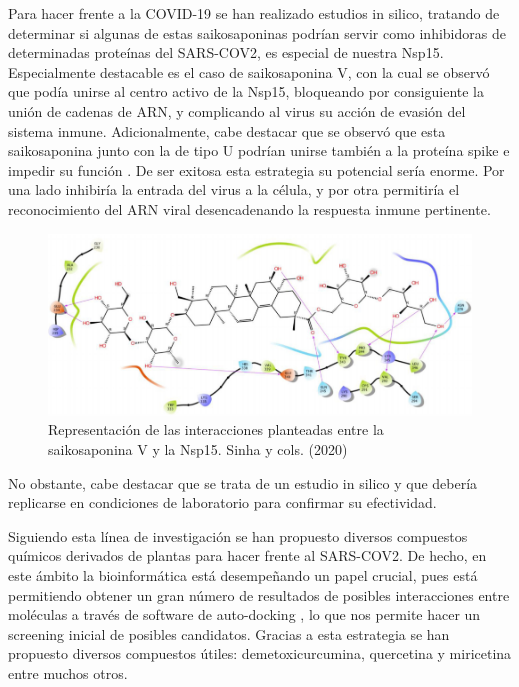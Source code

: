 \documentclass[12pt]{article}
\begin{document}
Para hacer frente a la COVID-19 se han realizado estudios in silico, tratando de determinar si algunas de estas saikosaponinas podrían servir como inhibidoras de determinadas proteínas del SARS-COV2, es especial de nuestra Nsp15. Especialmente destacable es el caso de saikosaponina V, con la cual se observó que podía unirse al centro activo de la Nsp15, bloqueando por consiguiente la unión de cadenas de ARN, y complicando al virus su acción de evasión del sistema inmune. Adicionalmente, cabe destacar que se observó que esta saikosaponina junto con la de tipo U podrían unirse también a la proteína spike e impedir su función \cite{Saurabh}. De ser exitosa esta estrategia su potencial sería enorme. Por una lado inhibiría la entrada del virus a la célula, y por otra permitiría el reconocimiento del ARN viral desencadenando la respuesta inmune pertinente. 
\newline

\begin{figure}[H]
\centering
\includegraphics[scale=0.65]{Screenshot_22}
\caption{Representación de las interacciones planteadas entre la saikosaponina V y la Nsp15. Sinha y cols. (2020)}  
\end{figure}


No obstante, cabe destacar que se trata de un estudio in silico y que debería replicarse en condiciones de laboratorio para confirmar su efectividad.
\newline

Siguiendo esta línea de investigación se han propuesto diversos compuestos químicos derivados de plantas para hacer frente al SARS-COV2. De hecho, en este ámbito la bioinformática está desempeñando un papel crucial, pues está permitiendo obtener un gran número de resultados de posibles interacciones entre moléculas a través de software de auto-docking \cite{Savale2021} \cite{Batool2021}, lo que nos permite hacer un screening inicial de posibles candidatos. Gracias a esta estrategia se han propuesto diversos compuestos útiles: demetoxicurcumina, quercetina y miricetina entre muchos otros. \cite{aniket} \cite{KUMAR2020153317} \cite{Umar2021} 
\newline
\end{document}
